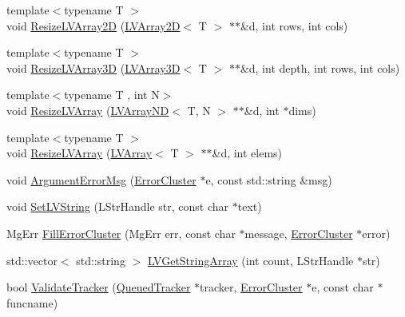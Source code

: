 \begin{DoxyCompactItemize}
\item 
{\footnotesize template$<$typename T $>$ }\\void \hyperlink{group__lab__functions_gaeb000b717bd3ec4502c7dd215ab5031e}{Resize\+L\+V\+Array2D} (\hyperlink{struct_l_v_array2_d}{L\+V\+Array2D}$<$ T $>$ $\ast$$\ast$\&d, int rows, int cols)
\item 
{\footnotesize template$<$typename T $>$ }\\void \hyperlink{group__lab__functions_gabeb483ad1312a277d2b8c6740fbed35f}{Resize\+L\+V\+Array3D} (\hyperlink{struct_l_v_array3_d}{L\+V\+Array3D}$<$ T $>$ $\ast$$\ast$\&d, int depth, int rows, int cols)
\item 
{\footnotesize template$<$typename T , int N$>$ }\\void \hyperlink{group__lab__functions_ga5008b8a19809d8fad16db159c6aff923}{Resize\+L\+V\+Array} (\hyperlink{struct_l_v_array_n_d}{L\+V\+Array\+ND}$<$ T, N $>$ $\ast$$\ast$\&d, int $\ast$dims)
\item 
{\footnotesize template$<$typename T $>$ }\\void \hyperlink{group__lab__functions_ga586b44022495cbba4d9d8d07cbb40212}{Resize\+L\+V\+Array} (\hyperlink{struct_l_v_array}{L\+V\+Array}$<$ T $>$ $\ast$$\ast$\&d, int elems)
\item 
void \hyperlink{group__lab__functions_ga40d026eb54005767d41bee6c4a059e92}{Argument\+Error\+Msg} (\hyperlink{struct_error_cluster}{Error\+Cluster} $\ast$e, const std\+::string \&msg)
\item 
void \hyperlink{group__lab__functions_gafa2a79fe1916d42003e1977c5275e94b}{Set\+L\+V\+String} (L\+Str\+Handle str, const char $\ast$text)
\item 
Mg\+Err \hyperlink{group__lab__functions_ga1363f444ed040befa4d285e576743907}{Fill\+Error\+Cluster} (Mg\+Err err, const char $\ast$message, \hyperlink{struct_error_cluster}{Error\+Cluster} $\ast$error)
\item 
std\+::vector$<$ std\+::string $>$ \hyperlink{group__lab__functions_gaada2e36cea8ad6f5c5a9371c7f71839c}{L\+V\+Get\+String\+Array} (int count, L\+Str\+Handle $\ast$str)
\item 
bool \hyperlink{group__lab__functions_ga4d26499106cd9ee7e2197a1c785d2dc8}{Validate\+Tracker} (\hyperlink{class_queued_tracker}{Queued\+Tracker} $\ast$tracker, \hyperlink{struct_error_cluster}{Error\+Cluster} $\ast$e, const char $\ast$funcname)
\end{DoxyCompactItemize}


